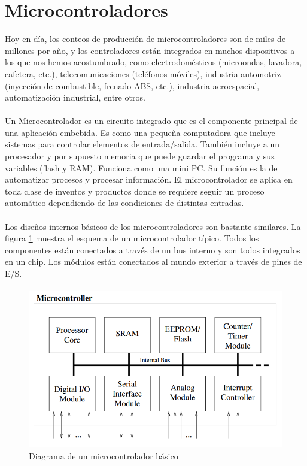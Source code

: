 \section{Microcontroladores}
Hoy en día, los conteos de producción de microcontroladores son de miles de millones por año, y los controladores están integrados en muchos dispositivos a los que nos hemos acostumbrado, como electrodomésticos (microondas, lavadora, cafetera, etc.), telecomunicaciones (teléfonos móviles), industria automotriz (inyección de combustible, frenado ABS, etc.), industria aeroespacial, automatización industrial, entre otros.
\paragraph{}
Un Microcontrolador es un circuito integrado que es el componente principal de una aplicación embebida. Es como una pequeña computadora que incluye sistemas para controlar elementos de entrada/salida. También incluye a un procesador y por supuesto memoria que puede guardar el programa y sus variables (flash y RAM).  Funciona como una mini PC. Su función es la de automatizar procesos y procesar información.
El microcontrolador se aplica en toda clase de inventos y productos donde se requiere seguir un proceso automático dependiendo de las condiciones de distintas entradas.
\paragraph{}
Los diseños internos básicos de los microcontroladores son bastante similares. La figura \ref{fig:diagrama_micro} muestra el esquema de un microcontrolador típico. Todos los componentes están conectados a través de un bus interno y son todos integrados en un chip. Los módulos están conectados al mundo exterior a través de pines de E/S.
\paragraph{}
\begin{figure}[H]
	\centering
	\includegraphics[scale=.5]{Capitulo2/images/microcontrolador.png}
	\caption{Diagrama de un microcontrolador básico}
	\label{fig:diagrama_micro}
\end{figure}
